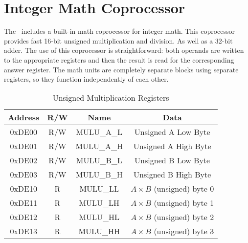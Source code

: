 \chapter{Integer Math Coprocessor}
\label{sec:int_math_copro}

The \jr\ includes a built-in math coprocessor for integer math. This coprocessor provides fast 16-bit unsigned multiplication and division. As well as a 32-bit adder. The use of this coprocessor is straightforward: both operands are written to the appropriate registers and then the result is read for the corresponding answer register. The math units are completely separate blocks using separate registers, so they function independently of each other.

\begin{table}[ht]
    \begin{center}
        \begin{tabular}{|c|c|c|c|} \hline
            Address & R/W & Name & Data \\\hline\hline
            0xDE00  & R/W & MULU\_A\_L & Unsigned A Low Byte \\\hline
            0xDE01  & R/W & MULU\_A\_H & Unsigned A High Byte \\\hline
            0xDE02  & R/W & MULU\_B\_L & Unsigned B Low Byte \\\hline
            0xDE03  & R/W & MULU\_B\_H & Unsigned B High Byte \\\hline
            0xDE10  & R   & MULU\_LL   & $A \times B$ (unsigned) byte 0 \\\hline
            0xDE11  & R   & MULU\_LH   & $A \times B$ (unsigned) byte 1 \\\hline
            0xDE12  & R   & MULU\_HL   & $A \times B$ (unsigned) byte 2 \\\hline
            0xDE13  & R   & MULU\_HH   & $A \times B$ (unsigned) byte 3 \\\hline
        \end{tabular}
    \end{center}
    \caption{Unsigned Multiplication Registers}
    \label{tab:math_mult_reg}
\end{table}

